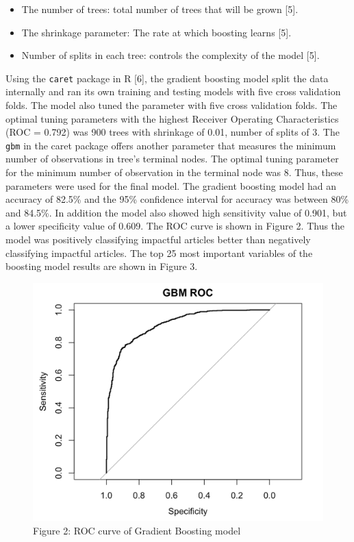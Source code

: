 \documentclass[10pt,letterpaper]{article}
\providecommand{\tightlist}{%
  \setlength{\itemsep}{0pt}\setlength{\parskip}{0pt}}
\begin{document}
\begin{itemize}
\tightlist
\item
  The number of trees: total number of trees that will be grown {[}5{]}.
\item
  The shrinkage parameter: The rate at which boosting learns {[}5{]}.
\item
  Number of splits in each tree: controls the complexity of the model
  {[}5{]}.
\end{itemize}

Using the \texttt{caret} package in R {[}6{]}, the gradient boosting
model split the data internally and ran its own training and testing
models with five cross validation folds. The model also tuned the
parameter with five cross validation folds. The optimal tuning
parameters with the highest Receiver Operating Characteristics (ROC =
0.792) was 900 trees with shrinkage of 0.01, number of splits of 3. The
\texttt{gbm} in the caret package offers another parameter that measures
the minimum number of observations in tree's terminal nodes. The optimal
tuning parameter for the minimum number of observation in the terminal
node was 8. Thus, these parameters were used for the final model. The
gradient boosting model had an accuracy of 82.5\% and the 95\%
confidence interval for accuracy was between 80\% and 84.5\%. In
addition the model also showed high sensitivity value of 0.901, but a
lower specificity value of 0.609. The ROC curve is shown in Figure 2.
Thus the model was positively classifying impactful articles better than
negatively classifying impactful articles. The top 25 most important
variables of the boosting model results are shown in Figure 3.

\begin{figure}
\centering
\includegraphics{roc_gbm.png}
\caption{Figure 2: ROC curve of Gradient Boosting model}
\end{figure}
\end{document}
